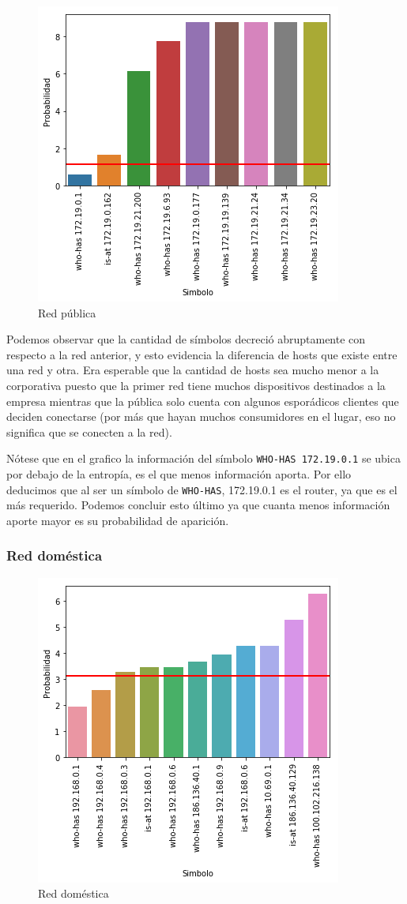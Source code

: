 \begin{figure}[H]
	\centering
	\includegraphics[width=.5\linewidth]{imagenes/mac_hosts}
	\caption{Red pública}
\end{figure}

Podemos observar que la cantidad de símbolos decreció abruptamente con respecto a la red anterior, y esto evidencia la diferencia de hosts que existe entre una red y otra. Era esperable que la cantidad de hosts sea mucho menor a la corporativa puesto que la primer red tiene muchos dispositivos destinados a la empresa mientras que la pública solo cuenta con algunos esporádicos clientes que deciden conectarse (por más que hayan muchos consumidores en el lugar, eso no significa que se conecten a la red).


Nótese que en el grafico la información del símbolo \texttt{WHO-HAS 172.19.0.1} se ubica por debajo de la entropía, es el que menos información aporta. Por ello deducimos que al ser un símbolo de \texttt{WHO-HAS}, 172.19.0.1 es el router, ya que es el más requerido. Podemos concluir esto último ya que cuanta menos información aporte mayor es su probabilidad de aparición.

 
\subsubsection{Red doméstica}

\begin{figure}[H]
	\centering
	\includegraphics[width=.5\linewidth]{imagenes/manu_casa_hosts}
	\caption{Red doméstica}
\end{figure}
